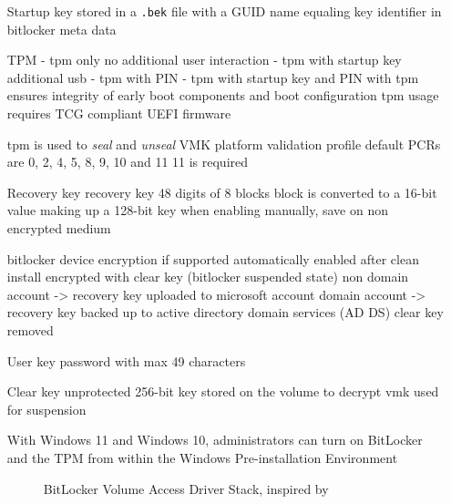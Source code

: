 \begin{itemize}
    \item[Startup key] stored in a \lstinline{.bek} file with a \ac{GUID} name equaling key identifier in bitlocker meta data
        \cite[2.6. Startup key]{bde-format-spec}
    \item[TPM]
        - tpm only
        no additional user interaction
        - tpm with startup key
        additional usb
        - tpm with PIN
        - tpm with startup key and PIN
        \cite{microsoft-bitlocker-countermeasures}
        with tpm ensures integrity of early boot components and boot configuration
        tpm usage requires \ac{TCG} compliant \ac{UEFI} firmware \cite[9. TPM]{windows-internals-6-part2}

        tpm is used to \emph{seal} and \emph{unseal} \ac{VMK}
        platform validation profile
        default \acp{PCR} are 0, 2, 4, 5, 8, 9, 10 and 11
        11 is required
    \item[Recovery key] recovery key 48 digits of 8 blocks
        block is converted to a 16-bit value making up a 128-bit key
        \cite[2.4. Recovery key]{bde-format-spec}
        when enabling manually, save on non encrypted medium
        \cite{microsoft-bitlocker-basic-deployment}

        bitlocker device encryption if supported automatically enabled
        after clean install encrypted with clear key (bitlocker suspended state)
        non domain account -> recovery key uploaded to microsoft account
        domain account -> recovery key backed up to active directory domain services (AD DS)
        clear key removed
        \cite{microsoft-bitlocker-device-encryption}

    \item[User key] password with max 49 characters
        \cite[2.7. User key]{bde-format-spec}
    \item[Clear key] unprotected 256-bit key stored on the volume to decrypt vmk
        \cite[2.5. Clear key]{bde-format-spec}
        used for suspension


         With Windows 11 and Windows 10, administrators can turn on BitLocker and the TPM from within the Windows Pre-installation Environment \cite{microsoft-bitlocker-device-encryption}

        \begin{figure}[htb]%
            \centering
            
            \caption{BitLocker Volume Access Driver Stack, inspired by \cite[Figure 9-24]{windows-internals6-part2}}%
            \label{fig:bitlocker_volume_access_driver_stack}%
        \end{figure}

\end{itemize}